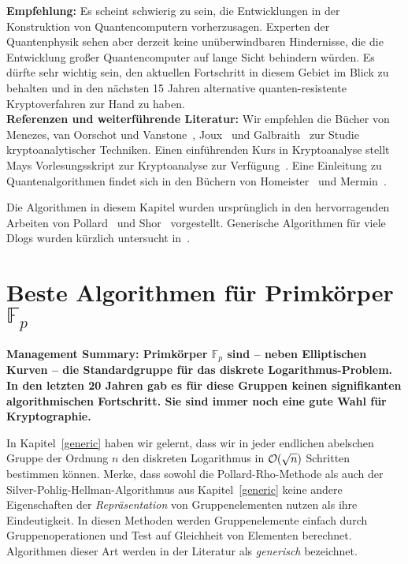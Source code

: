 \begin{refsegment}
\textbf{Empfehlung:} Es scheint schwierig zu sein, die Entwicklungen in der Konstruktion von Quantencomputern vorherzusagen. Experten der Quantenphysik sehen aber derzeit keine unüberwindbaren Hindernisse, die die Entwicklung großer Quantencomputer auf lange Sicht behindern würden. Es dürfte sehr wichtig sein, den aktuellen Fortschritt in diesem Gebiet im Blick zu behalten und in den nächsten 15 Jahren alternative quanten-resistente Kryptoverfahren zur Hand zu haben.\\[0.1cm]

\textbf{Referenzen und weiterführende Literatur:}
Wir empfehlen die Bücher von Menezes, van Oorschot und Vanstone~\cite{Menezes2001}, Joux~\cite{Joux2009} und Galbraith~\cite{Galbraith2012} zur Studie kryptoanalytischer Techniken. Einen einführenden Kurs in Kryptoanalyse stellt Mays Vorlesungsskript zur Kryptoanalyse zur Verfügung~\cite{May2012a,May2012b}. Eine Einleitung zu Quantenalgorithmen findet sich in den Büchern von Homeister~\cite{Homeister2007} und Mermin~\cite{Mermin2008}.

Die Algorithmen in diesem Kapitel wurden ursprünglich in den hervorragenden Arbeiten von Pollard~\cite{Pollard1975,Pollard2000} und Shor~\cite{Shor1994} vorgestellt.
Generische Algorithmen für viele Dlogs wurden kürzlich untersucht in~\cite{multiple2014}.


\section{\texorpdfstring{Beste Algorithmen für Primkörper $\mathbb{F}_p$}{Beste Algorithmen für Primkörper Fp}}
\label{prime_field}
\textbf{Management Summary: Primkörper $\mathbb{F}_p$ sind -- neben Elliptischen Kurven -- die Standardgruppe für das diskrete Logarithmus-Problem. In den letzten 20 Jahren gab es für diese Gruppen keinen signifikanten algorithmischen Fortschritt. Sie sind immer noch eine gute Wahl für Kryptographie.\\[0.1cm]}

In Kapitel~\ref{generic} haben wir gelernt, dass wir in jeder endlichen abelschen Gruppe der Ordnung $n$ den diskreten Logarithmus in ${\cal O}(\sqrt n)$ Schritten bestimmen können. Merke, dass sowohl die Pollard-Rho-Methode als auch der Silver-Pohlig-Hellman-Algorithmus aus Kapitel~\ref{generic} keine andere Eigenschaften der {\em Repräsentation} von Gruppenelementen nutzen als ihre Eindeutigkeit. In diesen Methoden werden Gruppenelemente einfach durch Gruppenoperationen und Test auf Gleichheit von Elementen berechnet. Algorithmen dieser Art werden in der Literatur als {\em generisch} bezeichnet.


\end{refsegment}
